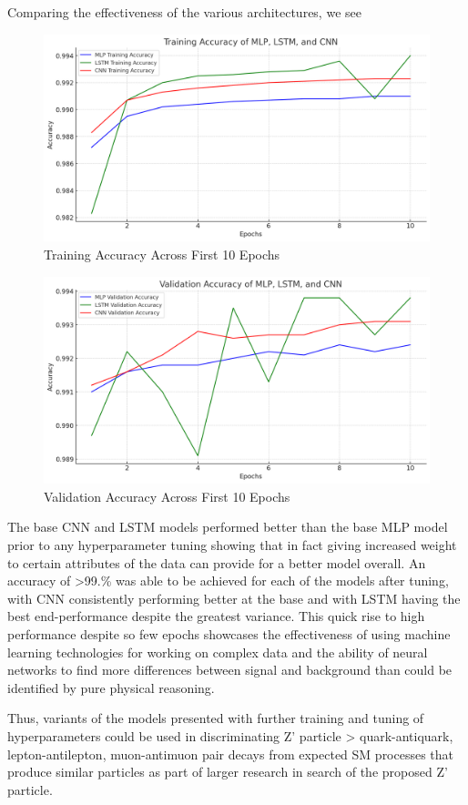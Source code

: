 \documentclass[twocolumn]{webofc}
\begin{document}
Comparing the effectiveness of the various architectures, we see

\begin{figure}[!htb]
    \centering
    \includegraphics[width=0.5\linewidth]{trainingaccuracy.png}
    \caption{Training Accuracy Across First 10 Epochs}
    \label{fig:enter-label}
\end{figure}

\begin{figure}[!htb]
    \centering
    \includegraphics[width=0.5\linewidth]{validationaccuracy-2.png}
    \caption{Validation Accuracy Across First 10 Epochs}
    \label{fig:enter-label}
\end{figure}

The base CNN and LSTM models performed better than the base MLP model prior to any hyperparameter tuning showing that in fact giving increased weight to certain attributes of the data can provide for a better model overall. An accuracy of >99.\% was able to be achieved for each of the models after tuning, with CNN consistently performing better at the base and with LSTM having the best end-performance despite the greatest variance. This quick rise to high performance despite so few epochs showcases the effectiveness of using machine learning technologies for working on complex data and the ability of neural networks to find more differences between signal and background than could be identified by pure physical reasoning. 

Thus, variants of the models presented with further training and tuning of hyperparameters could be used in discriminating Z' particle > quark-antiquark, lepton-antilepton, muon-antimuon pair decays from expected SM processes that produce similar particles as part of larger research in search of the proposed Z' particle.
\end{document}
